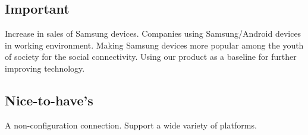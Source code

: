\documentclass[12pt]{article}
\begin{document}
\subsection{Important}
	Increase in sales of Samsung devices. Companies using Samsung/Android devices in working environment. Making Samsung devices more popular among the youth of society for the social connectivity. Using our product as a baseline for further improving technology.
\subsection{Nice-to-have's}
	A non-configuration connection. Support a wide variety of platforms.
\end{document}
